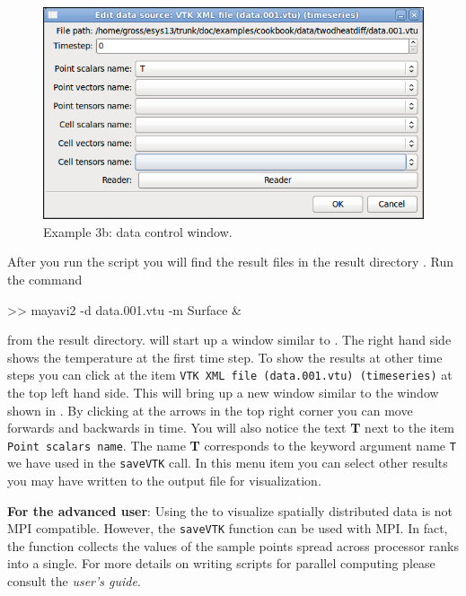 \begin{figure}[ht]
\centerline{\includegraphics[width=4.in]{figures/ScreeshotMayavi2n2}}
\caption{Example 3b: \mayavi data control window.}
\label{fig:mayavi window2}
\end{figure}
After you run the script you will find the 
result files  in the result directory . Run the 
command
\begin{python}
>> mayavi2 -d data.001.vtu -m Surface &
\end{python}
from the result directory. \mayavi will start up a window similar to .
The right hand side shows the temperature at the first time step. To show
the results at other time steps you can click at the item \texttt{VTK XML file (data.001.vtu) (timeseries)}
at the top left hand side. This will bring up a new window similar to the window shown in  . By clicking at the arrows in the top right corner you can move forwards and backwards in time. 
You will also notice the text \textbf{T} next to the item \texttt{Point scalars name}. The
name \textbf{T} corresponds to the keyword argument name \texttt{T} we have used 
in the \verb|saveVTK| call. In this menu item you can select other results 
you may have written to the output file for visualization.

\textbf{For the advanced user}: Using the \modmpl to visualize spatially distributed data 
is not MPI compatible. However, the \verb|saveVTK| function can be used with MPI. In fact,
the function collects the values of the sample points spread across processor ranks into a single.
For more details on writing scripts for parallel computing please consult the \emph{user's guide}.